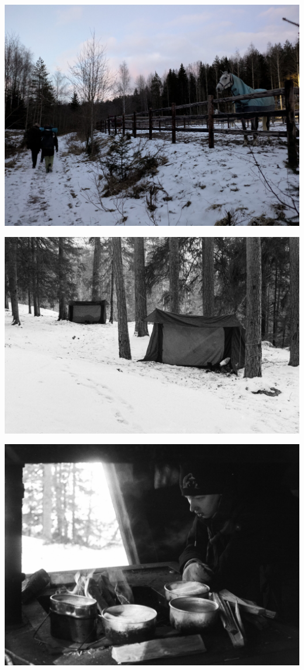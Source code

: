 \begin{multicols}{2}
\vspace*{0.04cm}
\noindent\includegraphics[width=1.0\linewidth,trim={0 10cm 0 10cm},clip]{assets/minihaikki1}

\vspace*{-0.32cm}
\noindent\includegraphics[width=1.0\linewidth,trim={0 2cm 0 2cm},clip]{assets/minihaikki2}

\noindent\includegraphics[width=1.0\linewidth,trim={0 0 0 0},clip]{assets/minihaikki3}


\end{multicols}
